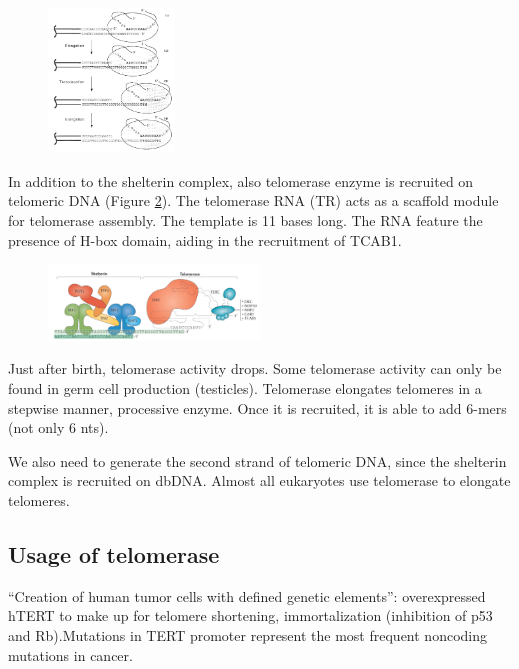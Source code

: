 \begin{figure}
\centering
\includegraphics[width=0.3\textwidth]{../_resources/Screen_Shot_2022-12-15_at_22-58-03.png}
\caption{}
\label{fig:temp}
\end{figure}

In addition to the shelterin complex, also telomerase enzyme is
recruited on telomeric DNA (Figure \ref{fig:recr}). The telomerase RNA (TR) acts as a scaffold
module for telomerase assembly. The template is 11 bases long. The RNA
feature the presence of H-box domain, aiding in the recruitment of
TCAB1.

\begin{figure}
\centering
\includegraphics[width=0.5\textwidth]{../_resources/Screen_Shot_2022-12-15_at_22-58-28.png}
\caption{}
\label{fig:recr}
\end{figure}

Just after birth, telomerase activity drops. Some telomerase activity
can only be found in germ cell production (testicles). Telomerase
elongates telomeres in a stepwise manner, processive enzyme. Once it is
recruited, it is able to add 6-mers (not only 6 nts).

We also need to generate the second strand of telomeric DNA, since the
shelterin complex is recruited on dbDNA. Almost all eukaryotes use
telomerase to elongate telomeres.

\hypertarget{usage-of-telomerase}{%
\subsection{Usage of telomerase}\label{usage-of-telomerase}}

``Creation of human tumor cells with defined genetic elements'':
overexpressed hTERT to make up for telomere shortening, immortalization
(inhibition of p53 and Rb).Mutations in TERT promoter represent the most frequent noncoding
mutations in cancer.

